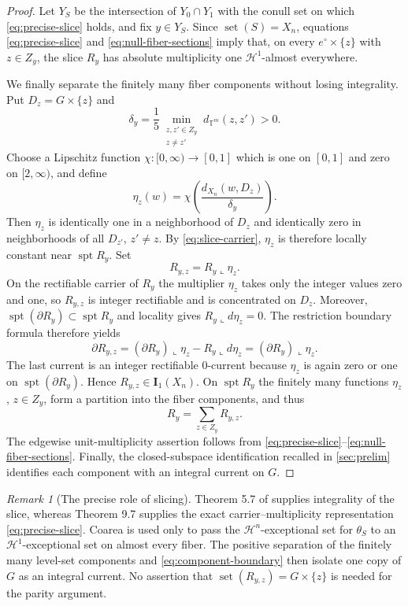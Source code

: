 \documentclass[11pt]{article}
\theoremstyle{remark}
\newtheorem{remark}[theorem]{Remark}
\newcommand{\I}{\mathbf I}
\newcommand{\Hh}{\mathcal H}
\newcommand{\set}{\operatorname{set}}
\newcommand{\spt}{\operatorname{spt}}
\begin{document}
\begin{proof}
Let $Y_S$ be the intersection of $Y_0\cap Y_1$ with the conull set on which
\eqref{eq:precise-slice} holds, and fix $y\in Y_S$. Since
$\set(S)=X_n$, equations \eqref{eq:precise-slice} and
\eqref{eq:null-fiber-sections} imply that, on every
$e^\circ\times\{z\}$ with $z\in Z_y$, the slice $R_y$ has absolute
multiplicity one $\Hh^1$-almost everywhere.

We finally separate the finitely many fiber components without losing
integrality. Put $D_z=G\times\{z\}$ and
\[
       \delta_y=\frac15
       \min_{\substack{z,z'\in Z_y\\ z\ne z'}}
       d_{\mathbb T^m}(z,z')>0.
\]
Choose a Lipschitz function $\chi:[0,\infty)\to[0,1]$ which is one on
$[0,1]$ and zero on $[2,\infty)$, and define
\[
       \eta_z(w)=\chi\!\left(
          \frac{d_{X_n}(w,D_z)}{\delta_y}
       \right).
\]
Then $\eta_z$ is identically one in a neighborhood of $D_z$ and identically
zero in neighborhoods of all $D_{z'}$, $z'\ne z$. By
\eqref{eq:slice-carrier}, $\eta_z$ is therefore locally constant near
$\spt R_y$. Set
\[
       R_{y,z}=R_y\llcorner\eta_z.
\]
On the rectifiable carrier of $R_y$ the multiplier $\eta_z$ takes only the
integer values zero and one, so $R_{y,z}$ is integer rectifiable and is
concentrated on $D_z$. Moreover,
$\spt(\partial R_y)\subset\spt R_y$ and locality gives
$R_y\llcorner d\eta_z=0$. The restriction boundary formula therefore yields
\begin{equation}\label{eq:component-boundary}
 \partial R_{y,z}
   =(\partial R_y)\llcorner\eta_z
     -R_y\llcorner d\eta_z
   =(\partial R_y)\llcorner\eta_z.
\end{equation}
The last current is an integer rectifiable $0$-current because $\eta_z$ is
again zero or one on $\spt(\partial R_y)$. Hence
$R_{y,z}\in\I_1(X_n)$. On $\spt R_y$ the finitely many functions
$\eta_z$, $z\in Z_y$, form a partition into the fiber components, and thus
\[
       R_y=\sum_{z\in Z_y}R_{y,z}.
\]
The edgewise unit-multiplicity assertion follows from
\eqref{eq:precise-slice}--\eqref{eq:null-fiber-sections}. Finally, the
closed-subspace identification recalled in \cref{sec:prelim} identifies
each component with an integral current on $G$.
\end{proof}

\begin{remark}[The precise role of slicing]\label{rem:slicing}
Theorem 5.7 of \cite{AK00} supplies integrality of the slice, whereas
Theorem 9.7 supplies the exact carrier--multiplicity representation
\eqref{eq:precise-slice}. Coarea is used only to pass the
$\Hh^n$-exceptional set for $\theta_S$ to an $\Hh^1$-exceptional set on
almost every fiber. The positive separation of the finitely many level-set
components and \eqref{eq:component-boundary} then isolate one copy of $G$
as an integral current. No assertion that
$\set(R_{y,z})=G\times\{z\}$ is needed for the parity argument.
\end{remark}
\end{document}
